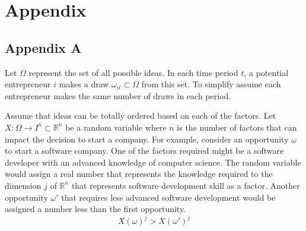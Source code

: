 \documentclass[12pt]{article}
\begin{document}
\begin{comment}

Our results point the way to future research in this area. Our results may be sensitive to for example the subsidy schedule based on income implemented in Massachusetts. In addition, more precise firm creation data sources may allow us to make stronger statements about the types of industries that benefited from health care reform.


Reasons why no result is plausible: 
People will do this anyway
Cost of insurance is not covered; still expensive. 
People disuaded small sub-sample of entrepreneurs, pre-existing conditions or those with kids but no spousal insurance or access to VC funds

However 
Long and Dahlen \footnote{Long Dahlen 2014} and Long, Stockly and Nordahl \footnote{2012} show insurance rates increased primarily among low income, childless adults. Not the demographic for entrepreneurs. 

\end{comment}

\newpage

\appendix
\section*{Appendix}
\subsection*{Appendix A}

Let $\Omega$ represent the set of all possible ideas. In each time period $t$, a potential entrepreneur $i$ makes a draw $\omega_{it} \subset \Omega$ from this set. To simplify assume each entrepreneur makes the same number of draws in each period. 

Assume that ideas can be totally ordered based on each of the factors. Let $X:\Omega\to I^n \subset \mathbb{R}^n$ be a random variable where $n$ is the number of factors that can impact the decision to start a company. For example, consider an opportunity $\omega$ to start a software company. One of the factors required might be a software developer with an advanced knowledge of computer science. The random variable would assign a real number that represents the knowledge required to the dimension $j$ of $\mathbb{R}^n$ that represents software development skill as a factor. Another opportunity $\omega'$ that requires less advanced software development would be assigned a number less than the first opportunity. 
$$X(\omega)^j > X(\omega')^j $$
\end{document}
